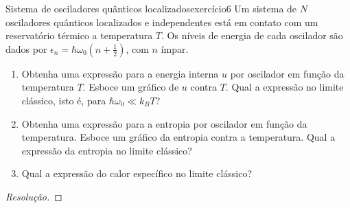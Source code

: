\begin{exercício}{Sistema de osciladores quânticos localizados}{exercício6}
    Um sistema de \(N\) osciladores quânticos localizados e independentes está em contato com um reservatório térmico a temperatura \(T\). Os níveis de energia de cada oscilador são dados por \(\epsilon_n = \hbar \omega_0 (n + \frac12)\), com \(n\) ímpar.
    \begin{enumerate}[label=(\alph*)]
        \item Obtenha uma expressão para a energia interna \(u\) por oscilador em função da temperatura \(T\). Esboce um gráfico de \(u\) contra \(T\). Qual a expressão no limite clássico, isto é, para \(\hbar \omega_0 \ll k_B T\)?
        \item Obtenha uma expressão para a entropia por oscilador em função da temperatura. Esboce um gráfico da entropia contra a temperatura. Qual a expressão da entropia no limite clássico?
        \item  Qual a expressão do calor específico no limite clássico?
    \end{enumerate}
\end{exercício}
\begin{proof}[Resolução]

\end{proof}

